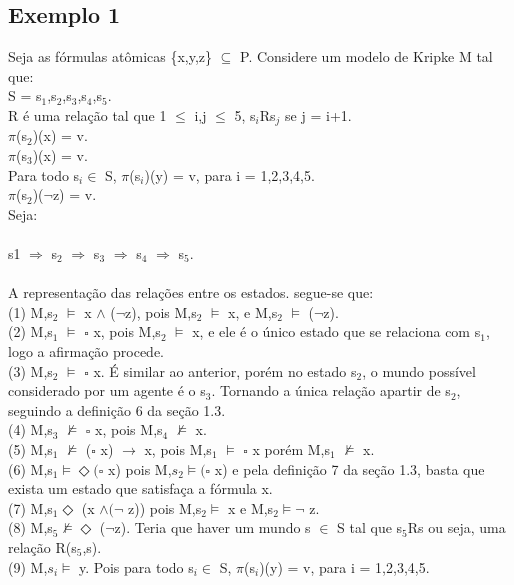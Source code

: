 \documentclass[12pt]{report}
\begin{document}
\subsection{Exemplo 1}
\hspace{0.5cm} Seja as fórmulas atômicas \{x,y,z\} $\subseteq $ P. Considere um modelo de Kripke M tal que:\\
S = s$_{1}$,s$_{2}$,s$_{3}$,s$_{4}$,s$_{5}$.\\
R é uma relação tal que 1 $\leq $ i,j $\leq$ 5, s$_{i}$Rs$_{j}$ se j = i+1.\\
$\pi$(s$_{2}$)(x) = v. \\
$\pi$(s$_{3}$)(x) = v. \\
Para todo s$_{i}\in$ S, $\pi$(s$_{i}$)(y) = v, para i = 1,2,3,4,5.\\
$\pi$(s$_{2}$)($\neg$z) = v.\\
Seja:\\ \\
s1 $\Longrightarrow$ s$_{2}$ $\Longrightarrow$ s$_{3}$ $\Longrightarrow$ s$_{4}$ $\Longrightarrow$ s$_{5}$.\\
\\ A representação das relações entre os estados. segue-se que:\\
(1) M,s$_{2}$ $\models$ x $\wedge$ ($\neg$z), pois M,s$_{2}$ $\models$ x, e M,s$_{2}$ $\models$ ($\neg$z).\\
(2) M,s$_{1}$ $\models$ $\square$ x, pois M,s$_{2}$ $\models$ x, e ele é o único estado que se relaciona com s$_{1}$, logo a afirmação procede.\\
(3) M,s$_{2}$ $\models$ $\square$ x. É similar ao anterior, porém no estado s$_{2}$, o mundo possível considerado por um agente é o s$_{3}$. Tornando a única relação apartir de s$_{2}$, seguindo a definição 6 da seção 1.3.\\
(4) M,s$_{3}$ $\nvDash$ $\square$ x, pois M,s$_{4}$ $\nvDash$ x.\\
(5) M,s$_{1}$ $\nvDash$ ($\square$ x) $\rightarrow$ x, pois M,s$_{1}$ $\models$ $\square$ x porém M,s$_{1}$ $\nvDash$ x.\\
(6) M,s$_{1} \models   \Diamond (\square$ x) pois M,$s_{2} \models (\square$ x) e pela definição 7 da seção 1.3, basta que exista um estado que satisfaça a fórmula x.\\
(7) M,s$_{1}\Diamond$ (x $\wedge (\neg$ z)) pois M,s$_{2} \models$ x e M,s$_{2} \models \neg$ z.\\
(8) M,s$_{5} \nvDash \Diamond$ ($\neg$z). Teria que haver um mundo s $\in $ S tal que s$_{5}$Rs ou seja, uma relação R(s$_{5}$,s).\\
(9) M,$s_{i}\models$ y. Pois para todo s$_{i}\in$ S, $\pi$(s$_{i}$)(y) = v, para i = 1,2,3,4,5.


  
\end{document}
